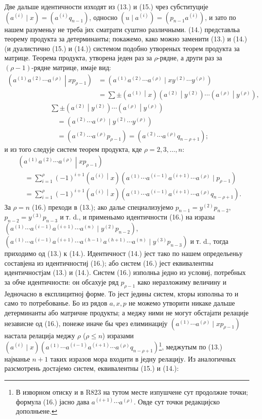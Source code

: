 \documentclass[11pt]{article}
\newcommand{\pair}[2]{\left(#1\middle|#2\right)}
\begin{document}
Две дальше идентичности изходят из (13.) и (15.) чрез субституције $(a^{(i)}\mid x)=(a^{(i)}q_{n-1})$, односно $(u\mid a^{(i)})=(p_{n-1}a^{(i)})$, и зато по нашем разуменьу не треба јих сматрати суштно различными. (14.) представльа теорему продукта за детерминанты; покажемо, како можно заменити (13.) и (14.) (и дуалистично (15.) и (14.)) системом подобно утвореных теорем продукта за матрице. Теорема продукта, утворена једен раз за $\rho$-рядне, а други раз за $(\rho-1)$-рядне матрице, имаје вид:
\[
\begin{aligned}
\pair{a^{(1)}a^{(2)}\cdots a^{(\rho)}}{xp_{\rho-1}}
&=(a^{(1)}a^{(2)}\cdots a^{(\rho)}\mid xy^{(2)}\cdots y^{(\rho)})\\
&=\sum\pm\pair{a^{(1)}}{x}\pair{a^{(2)}}{y^{(2)}}\cdots\pair{a^{(\rho)}}{y^{(\rho)}},
\end{aligned}
\]
\[
\begin{aligned}
&\sum\pm\pair{a^{(2)}}{y^{(2)}}\cdots\pair{a^{(\rho)}}{y^{(\rho)}}\\
&\quad=(a^{(2)}\cdots a^{(\rho)}\mid y^{(2)}\cdots y^{(\rho)})\\
&\quad=(a^{(2)}\cdots a^{(\rho)}p_{\rho-1})
=(a^{(2)}\cdots a^{(\rho)}q_{n-\rho+1});
\end{aligned}
\]
и из того следује систем теорем продукта, кде $\rho=2,3,\ldots,n$:
\begin{equation}
\begin{aligned}
&\pair{a^{(1)}a^{(2)}\cdots a^{(\rho)}}{xp_{\rho-1}}\\
&\quad=\sum_{i=1}^{\rho}(-1)^{i+1}\pair{a^{(i)}}{x}
(a^{(1)}\cdots a^{(i-1)}a^{(i+1)}\cdots a^{(\rho)}\mid p_{\rho-1})\\
&\quad=\sum_{i=1}^{\rho}(-1)^{i+1}\pair{a^{(i)}}{x}
(a^{(1)}\cdots a^{(i-1)}a^{(i+1)}\cdots a^{(\rho)}q_{n-\rho+1}).
\end{aligned}
\tag{16}
\end{equation}
За $\rho=n$ (16.) преходи в (13.); ако далье специализујемо $p_{n-1}=y^{(2)}p_{n-2}$, $p_{n-2}=y^{(3)}p_{n-3}$ и т. d., и применьамо идентичности (16.) на изразы $(a^{(1)}\cdots a^{(i-1)}a^{(i+1)}\cdots a^{(n)}\mid y^{(2)}p_{n-2})$, $(a^{(1)}\cdots a^{(i-1)}a^{(i+1)}\cdots a^{(h-1)}a^{(h+1)}\cdots a^{(n)}\mid y^{(3)}p_{n-3})$ и т. d., тогда приходимо од (13.) к (14.). Идентичност (14.) јест тако по нашем определьеньу составјена из идентичностиј (16.); або систем (16.) јест еквивалентны идентичностјам (13.) и (14.). Систем (16.) изполньа једно из условиј, потребных за обче идентичности: он обсахује ряд $p_{\rho-1}$ како неразложиму величину и Једночасно в експлицитној форме. То јест једины систем, кторы изполньа то и само то потребованье. Бо из рядов $a,x,p$ не можемо утворити никаке дальше детерминанты або матричне продукты; а меджу ними не могут обстајати релације независне од (16.), понеже иначе бы чрез елиминацију $(a^{(1)}\cdots a^{(\rho)}\mid xp_{\rho-1})$ настала релација меджу $\rho$ ($\rho\leq n$) изразами $(a^{(i)}\mid x)(a^{(1)}\cdots a^{(i-1)}a^{(i+1)}\cdots a^{(\rho)}q_{n-\rho+1})$\footnote{В изворном отиску и в R823 на тутом месте изпушчене сут продолжне точки; формула (16.) јасно дава $a^{(i+1)}\cdots a^{(\rho)}$. Овде сут точки редакцијско дополньене.}, меджутым по (13.) најманье $n+1$ таких изразов мора входити в једну релацију. Из аналогичных разсмотрень достајемо систем, еквивалентны (15.) и (14.):
\end{document}
